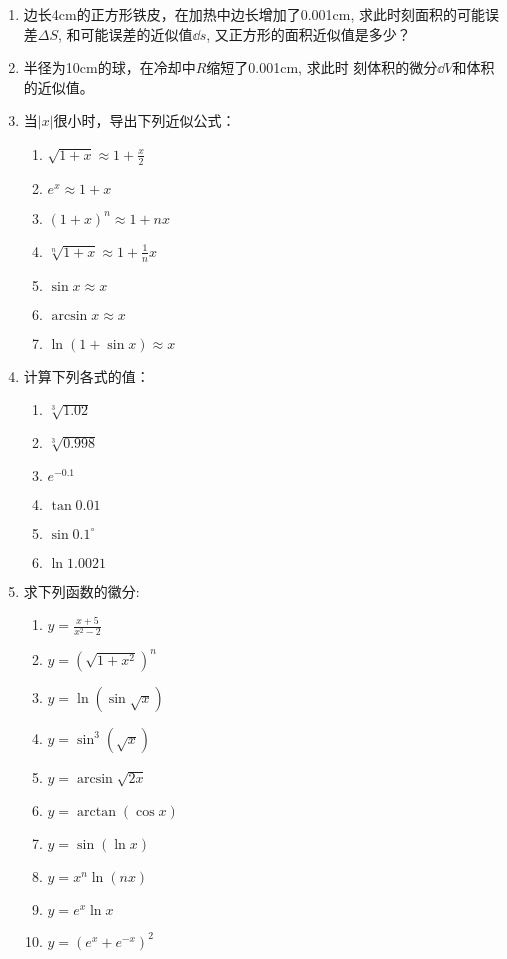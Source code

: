 \begin{ex}
\begin{enumerate}
    \item 边长4cm的正方形铁皮，在加热中边长增加了0.001cm, 
求此时刻面积的可能误差$\Delta S$, 和可能误差的近似值$\dd s$, 又正方形的面积近似值是多少？
\item 半径为10cm的球，在冷却中$R$缩短了0.001cm, 求此时
刻体积的微分$\dd V$和体积的近似值。
\item 当$|x|$很小时，导出下列近似公式：
\begin{multicols}{2}
\begin{enumerate}
    \item  $\sqrt{1+x} \approx 1+\frac{x}{2}$
\item $e^{x} \approx 1+x$
\item  $(1+x)^{n} \approx 1+n x$
\item  $\sqrt[n]{1+x} \approx 1+\frac{1}{n} x$
\item  $\sin x \approx x$
\item  $\arcsin x \approx x$
\item  $\ln (1+\sin x) \approx x$
\end{enumerate}
\end{multicols}

\item  计算下列各式的值：
\begin{multicols}{2}
\begin{enumerate}
\item  $\sqrt[3]{1.02}$
\item  $\sqrt[3]{0.998}$
\item   $e^{-0.1}$
\item   $\tan 0.01$ 
\item   $\sin 0.1^{\circ}$
\item   $\ln 1.0021$   
\end{enumerate}
\end{multicols}

\item 求下列函数的徽分:
\begin{multicols}{2}
\begin{enumerate}
    \item $y=\frac{x+5}{x^{2}-2}$
    \item  $y=\left(\sqrt{1+x^{2}}\right)^{n}$
    \item  $y=\ln (\sin \sqrt{x})$
    \item  $y=\sin ^{3}(\sqrt{x})$
    \item  $y=\arcsin \sqrt{2 x}$
    \item  $y=\arctan (\cos x)$ 
    \item $y=\sin (\ln x)$
    \item $y=x^{n} \ln (n x)$
    \item $y=e^{x} \ln x$
    \item $y=\left(e^{x}+e^{-x}\right)^{2}$
\end{enumerate}
\end{multicols}


\end{enumerate}
\end{ex}

